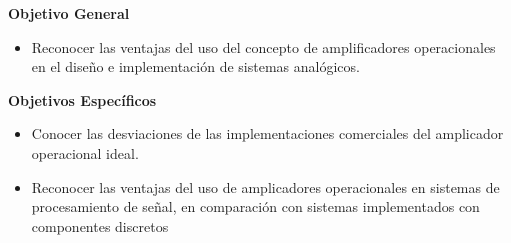 \textbf{Objetivo General}

\begin{itemize}
    \item Reconocer las ventajas del uso del concepto de amplificadores operacionales en el diseño e implementación de sistemas analógicos.
\end{itemize}

\textbf{Objetivos Específicos}

\begin{itemize}
    \item Conocer las desviaciones de las implementaciones comerciales del amplicador operacional ideal.
    \item Reconocer las ventajas del uso de amplicadores operacionales en sistemas de procesamiento de señal, en comparación con sistemas implementados con componentes discretos 
\end{itemize}
